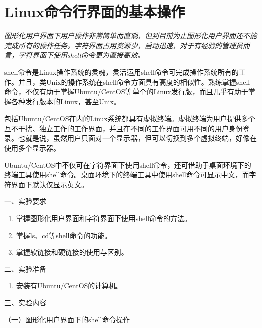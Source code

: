 \chapter{Linux命令行界面的基本操作}

{\itshape
图形化用户界面下用户操作非常简单而直观，但到目前为止图形化用户界面还不能完成所有的操作任务。字符界面占用资源少，启动迅速，对于有经验的管理员而言，字符界面下使用shell命令更为直接高效。

shell命令是Linux操作系统的灵魂，灵活运用shell命令可完成操作系统所有的工作。并且，类Unix的操作系统在shell命令方面具有高度的相似性。熟练掌握shell命令，不仅有助于掌握Ubuntu/CentOS等单个的Linux发行版，而且几乎有助于掌握各种发行版本的Linux，甚至Unix。

包括Ubuntu/CentOS在内的Linux系统都具有虚拟终端。虚拟终端为用户提供多个互不干扰、独立工作的工作界面，并且在不同的工作界面可用不同的用户身份登录。也就是说，虽然用户只面对一个显示器，但可以切换到多个虚拟终端，好像在使用多个显示器。

Ubuntu/CentOS中不仅可在字符界面下使用shell命令，还可借助于桌面环境下的终端工具使用shell命令。桌面环境下的终端工具中使用shell命令可显示中文，而字符界面下默认仅显示英文。
}

\vspace{0.2in}
\noindent
一、实验要求
\begin{enumerate}
  \item 掌握图形化用户界面和字符界面下使用shell命令的方法。
  \item 掌握ls、cd等shell命令的功能。
  \item 掌握软链接和硬链接的使用与区别。
\end{enumerate}

\vspace{0.2in}
\noindent
二、实验准备
\begin{enumerate}
  \item 安装有Ubuntu/CentOS的计算机。
\end{enumerate}

\vspace{0.2in}
\noindent
三、实验内容

\vspace{0.1in}
（一）图形化用户界面下的shell命令操作


